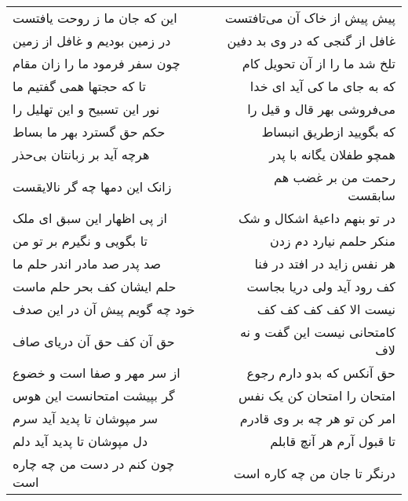 \begin{center}
\begin{longtable}{l p{0.5cm} r}
\\
این که جان ما ز روحت یافتست
&&
پیش پیش از خاک آن می‌تافتست
\\
در زمین بودیم و غافل از زمین
&&
غافل از گنجی که در وی بد دفین
\\
چون سفر فرمود ما را زان مقام
&&
تلخ شد ما را از آن تحویل کام
\\
تا که حجتها همی گفتیم ما
&&
که به جای ما کی آید ای خدا
\\
نور این تسبیح و این تهلیل را
&&
می‌فروشی بهر قال و قیل را
\\
حکم حق گسترد بهر ما بساط
&&
که بگویید ازطریق انبساط
\\
هرچه آید بر زبانتان بی‌حذر
&&
همچو طفلان یگانه با پدر
\\
زانک این دمها چه گر نالایقست
&&
رحمت من بر غضب هم سابقست
\\
از پی اظهار این سبق ای ملک
&&
در تو بنهم داعیهٔ اشکال و شک
\\
تا بگویی و نگیرم بر تو من
&&
منکر حلمم نیارد دم زدن
\\
صد پدر صد مادر اندر حلم ما
&&
هر نفس زاید در افتد در فنا
\\
حلم ایشان کف بحر حلم ماست
&&
کف رود آید ولی دریا بجاست
\\
خود چه گویم پیش آن در این صدف
&&
نیست الا کف کف کف کف
\\
حق آن کف حق آن دریای صاف
&&
کامتحانی نیست این گفت و نه لاف
\\
از سر مهر و صفا است و خضوع
&&
حق آنکس که بدو دارم رجوع
\\
گر بپیشت امتحانست این هوس
&&
امتحان را امتحان کن یک نفس
\\
سر مپوشان تا پدید آید سرم
&&
امر کن تو هر چه بر وی قادرم
\\
دل مپوشان تا پدید آید دلم
&&
تا قبول آرم هر آنچ قابلم
\\
چون کنم در دست من چه چاره است
&&
درنگر تا جان من چه کاره است
\\
\end{longtable}
\end{center}
